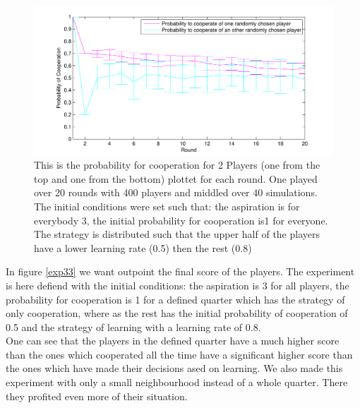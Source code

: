 \documentclass[11pt]{article}
\begin{document}
\begin{figure}
\centering
\includegraphics[scale=0.8]{ProbCoopwithtime30.pdf}
\caption[]{This is the probability for cooperation for 2 Players (one from the top and one from the bottom) plottet for each round. One played over 20 rounds with 400 players and middled over 40 simulations.  The initial conditions were set such that: the aspiration is for everybody 3, the initial probability for cooperation is1 for everyone. The strategy is distributed such that the upper half of the players have a lower learning rate (0.5) then the rest (0.8)}
\label{exp30time}
\end{figure}
In figure \ref{exp33} we want outpoint the final score of the players. The experiment is here defiend with the initial conditions: the aspiration is 3 for all players, the probability for cooperation is 1 for a defined quarter which has the strategy of only cooperation, where as the rest has the initial probability of cooperation of 0.5 and the strategy of learning with a learning rate of 0.8. 
\\One can see that the players in the defined quarter have a much higher score than the ones which cooperated all the time have a significant higher score than the ones which have made their decisions ased on learning. We also made this experiment with only a small neighbourhood instead of a whole quarter. There they profited even more of their situation.
\end{document}
